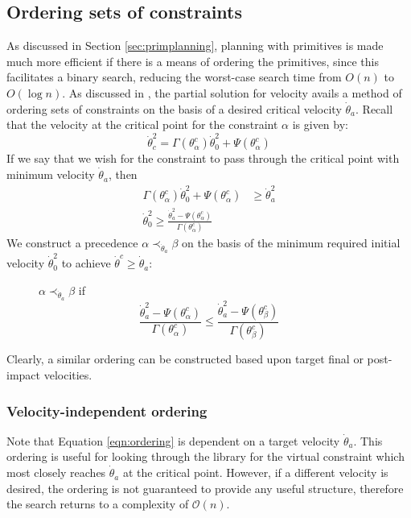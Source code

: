 \subsection{Ordering sets of constraints} \label{sec:orderings}
As discussed in Section \ref{sec:primplanning}, planning with primitives is made much more efficient if there is a means of ordering the primitives, since this facilitates a binary search, reducing the worst-case search time from $O(n)$ to $O(\log n)$. As discussed in \cite{manchester13planning}, the partial solution for velocity avails a method of ordering sets of constraints on the basis of a desired critical velocity $\dot{\theta}_a$. Recall that the velocity at the critical point for the constraint $\alpha$ is given by:
\[
	\dot{\theta}_c^2 = \Gamma(\theta_\alpha^c)\dot{\theta}_0^2 + \Psi(\theta_\alpha^c)
\]
If we say that we wish for the constraint to pass through the critical point with minimum velocity $\dot{\theta}_a$, then
\begin{align*}
	\Gamma(\theta_\alpha^c)\dot{\theta}_0^2 + \Psi(\theta_\alpha^c) &\geq \dot{\theta}_a^2 \\
	\dot{\theta}_0^2 \geq \frac{\dot{\theta}_a^2 - \Psi(\theta_\alpha^c)}{\Gamma(\theta_\alpha^c)}
\end{align*}
We construct a precedence $\alpha \prec_{\dot{\theta}_a} \beta$ on the basis of the minimum required initial velocity $\dot{\theta}_0^2$ to achieve $\dot{\theta}^c\geq\dot{\theta}_a$:

\begin{figure}[h]
\centering
$\alpha \prec_{\dot{\theta}_a} \beta$ if
\begin{equation} \label{eqn:ordering}
	\frac{\dot{\theta}_a^2 - \Psi(\theta_\alpha^c)}{\Gamma(\theta_\alpha^c)}
	\leq
	\frac{\dot{\theta}_a^2 - \Psi(\theta_\beta^c)}{\Gamma(\theta_\beta^c)}
\end{equation}
\end{figure}

Clearly, a similar ordering can be constructed based upon target final or post-impact velocities.

\subsubsection{Velocity-independent ordering}
Note that Equation \ref{eqn:ordering} is dependent on a target velocity $\dot{\theta}_a$. This ordering is useful for looking through the library for the virtual constraint which most closely reaches $\dot{\theta}_a$ at the critical point. However, if a different velocity is desired, the ordering is not guaranteed to provide any useful structure, therefore the search returns to a complexity of $\mathcal{O}(n)$.

